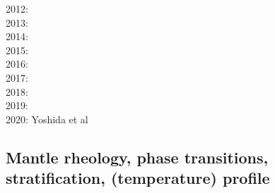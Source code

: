 {2012: \cite{bisa12}\cite{cort12b}\cite{deyt12}\cite{solo12}\cite{wele12}\\
2013: \cite{holj13}\cite{dadb13}\cite{toyd13}\cite{bogs13a}\cite{busa13}\cite{mika13}
      \cite{fabc13}\cite{cosr13}\cite{coml13}\cite{cost13}\cite{stha13}\cite{plth13}\cite{oflb13}\\
2014: \cite{arfw14}\cite{helo14}\cite{crta14}\cite{flgw14}\cite{roct14}\cite{cort14}\cite{becr14}
      \cite{nata14}\cite{stha14}\cite{stlh14}\cite{ogaw14}\\
2015: \cite{thkp15}\cite{wegg15}\cite{bect15}\cite{pesw15}\\
2016: \cite{frbs16}\cite{sisc16}\cite{boba16}\cite{wele16}\cite{welm16}\cite{vade16}\cite{chah16}\\
2017: \cite{ghts17}\cite{civj17}\\
2018: \cite{cold18}\cite{arcf18}\cite{cosh18}\cite{wele18}\\
2019: \cite{gult19}\cite{mazh19}\cite{cohf19}\cite{lewh19}\cite{ulcw19}\cite{boba19}\cite{fube19}
      \cite{plju19}\\
2020: \cite{lalt20}\cite{gugb20}\cite{yabt20} Yoshida et al \cite{yosy20}
}

\subsection{Mantle rheology, phase transitions, stratification, (temperature) profile}

